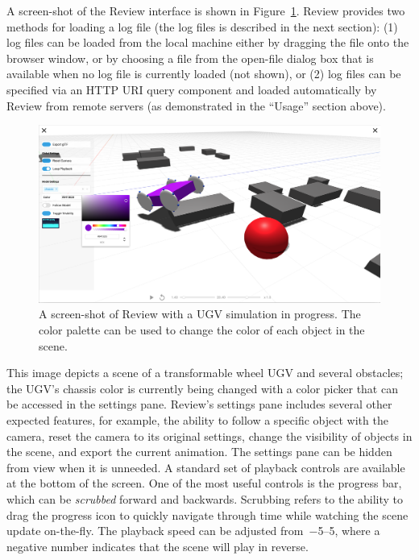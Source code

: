 A screen-shot of the Review interface is shown in Figure~\ref{fig:review_screenshot}.
%
Review provides two methods for loading a log file (the log files is described in the next section):
(1) log files can be loaded from the local machine either by dragging the file onto the browser window, or by choosing a file from the open-file dialog box that is available when no log file is currently loaded (not shown), or
(2) log files can be specified via an HTTP URI query component and loaded automatically by Review from remote servers (as demonstrated in the ``Usage'' section above).


\begin{figure}[htb!]
\centering
\includegraphics[width=0.9\columnwidth]{figures/review-screenshot.png}
\caption{A screen-shot of Review with a UGV simulation in progress. The color palette can be used to change the color of each object in the scene.}
\label{fig:review_screenshot}
\end{figure}


This image depicts a scene of a transformable wheel UGV and several obstacles; the UGV's chassis color is currently being changed with a color picker that can be accessed in the settings pane.
%
Review's settings pane includes several other expected features, for example, the ability to follow a specific object with the camera, reset the camera to its original settings, change the visibility of objects in the scene, and export the current animation.
%
The settings pane can be hidden from view when it is unneeded.
%
A standard set of playback controls are available at the bottom of the screen.
%
One of the most useful controls is the progress bar, which can be \emph{scrubbed} forward and backwards. Scrubbing refers to the ability to drag the progress icon to quickly navigate through time while watching the scene update on-the-fly.
%
The playback speed can be adjusted from~\numrange{-5}{5}, where a negative number indicates that the scene will play in reverse.




